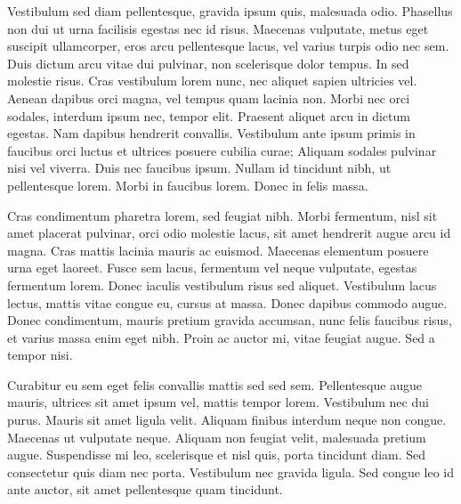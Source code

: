\documentclass[twoside]{article}
\begin{document}
Vestibulum sed diam pellentesque, gravida ipsum quis, malesuada odio. Phasellus non dui ut urna facilisis egestas nec id risus. Maecenas vulputate, metus eget suscipit ullamcorper, eros arcu pellentesque lacus, vel varius turpis odio nec sem. Duis dictum arcu vitae dui pulvinar, non scelerisque dolor tempus. In sed molestie risus. Cras vestibulum lorem nunc, nec aliquet sapien ultricies vel. Aenean dapibus orci magna, vel tempus quam lacinia non. Morbi nec orci sodales, interdum ipsum nec, tempor elit. Praesent aliquet arcu in dictum egestas. Nam dapibus hendrerit convallis. Vestibulum ante ipsum primis in faucibus orci luctus et ultrices posuere cubilia curae; Aliquam sodales pulvinar nisi vel viverra. Duis nec faucibus ipsum. Nullam id tincidunt nibh, ut pellentesque lorem. Morbi in faucibus lorem. Donec in felis massa.

Cras condimentum pharetra lorem, sed feugiat nibh. Morbi fermentum, nisl sit amet placerat pulvinar, orci odio molestie lacus, sit amet hendrerit augue arcu id magna. Cras mattis lacinia mauris ac euismod. Maecenas elementum posuere urna eget laoreet. Fusce sem lacus, fermentum vel neque vulputate, egestas fermentum lorem. Donec iaculis vestibulum risus sed aliquet. Vestibulum lacus lectus, mattis vitae congue eu, cursus at massa. Donec dapibus commodo augue. Donec condimentum, mauris pretium gravida accumsan, nunc felis faucibus risus, et varius massa enim eget nibh. Proin ac auctor mi, vitae feugiat augue. Sed a tempor nisi.

Curabitur eu sem eget felis convallis mattis sed sed sem. Pellentesque augue mauris, ultrices sit amet ipsum vel, mattis tempor lorem. Vestibulum nec dui purus. Mauris sit amet ligula velit. Aliquam finibus interdum neque non congue. Maecenas ut vulputate neque. Aliquam non feugiat velit, malesuada pretium augue. Suspendisse mi leo, scelerisque et nisl quis, porta tincidunt diam. Sed consectetur quis diam nec porta. Vestibulum nec gravida ligula. Sed congue leo id ante auctor, sit amet pellentesque quam tincidunt. 
\end{document}
